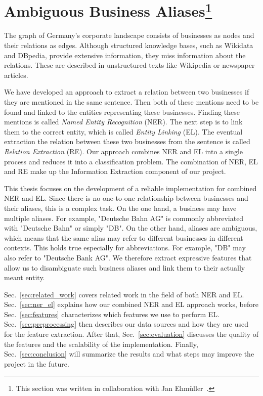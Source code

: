 \section[Ambiguous Business Aliases]{Ambiguous Business Aliases\protect\footnote{This section was written in collaboration with Jan Ehmüller~\cite{ehmueller}.}}
\label{sec:introduction}
The graph of Germany's corporate landscape consists of businesses as nodes and their relations as edges. Although structured knowledge bases, such as Wikidata and DBpedia, provide extensive information, they miss information about the relations. These are described in unstructured texts like Wikipedia or newspaper articles.

We have developed an approach to extract a relation between two businesses if they are mentioned in the same sentence. Then both of these mentions need to be found and linked to the entities representing these businesses. Finding these mentions is called \textit{Named Entity Recognition} (NER). The next step is to link them to the correct entity, which is called \textit{Entity Linking} (EL). The eventual extraction the relation between these two businesses from the sentence is called \textit{Relation Extraction} (RE). Our approach combines NER and EL into a single process and reduces it into a classification problem. The combination of NER, EL and RE make up the Information Extraction component of our project.

This thesis focuses on the development of a reliable implementation for combined NER and EL. Since there is no one-to-one relationship between businesses and their aliases, this is a complex task. On the one hand, a business may have multiple aliases. For example, "Deutsche Bahn AG" is commonly abbreviated with "Deutsche Bahn" or simply "DB". On the other hand, aliases are ambiguous, which means that the same alias may refer to different businesses in different contexts. This holds true especially for abbreviations. For example, "DB" may also refer to "Deutsche Bank AG". We therefore extract expressive features that allow us to disambiguate such business aliases and link them to their actually meant entity.

Sec.~\ref{sec:related_work} covers related work in the field of both NER and EL. Sec.~\ref{sec:ner_el} explains how our combined NER and EL approach works, before Sec.~\ref{sec:features} characterizes which features we use to perform EL. Sec.~\ref{sec:preprocessing} then describes our data sources and how they are used for the feature extraction. After that, Sec.~\ref{sec:evaluation} discusses the quality of the features and the scalability of the implementation. Finally, Sec.~\ref{sec:conclusion} will summarize the results and what steps may improve the project in the future.
